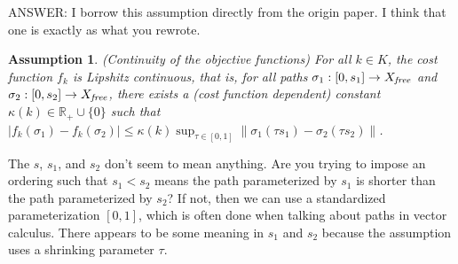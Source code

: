 \documentclass{article}
\newtheorem{asmp}{Assumption}
\begin{document}


{\sc ANSWER: I borrow this assumption directly from the origin paper. I think that one is exactly as what you rewrote.}

\begin{asmp}{(Continuity of the objective functions)}
\label{asmp:continuity}
For all $k\in K$, the cost function $f_k$ is Lipshitz continuous, that is, for all paths $\sigma_1 : [0, s_{1}] \rightarrow X_{\it free}$ and $ \sigma_2 : [0, s_{2}] \rightarrow X_{\it free}$, there exists a (cost function dependent) constant $\kappa(k)\in \mathbb{R}_{+}\cup \{0 \}$ such that $ | f_{k} ( \sigma_{1} ) - f_{k} ( \sigma_{2} ) | \leq \kappa(k) \sup_{\tau \in [0, 1]} \lVert \sigma_{1} (\tau s_{1}) - \sigma_{2} (\tau s_{2}) \rVert $.
\end{asmp}

{\sc The $s$, $s_1$, and $s_2$ don't seem to mean anything.  Are you trying to impose an ordering such that $s_1<s_2$ means the path parameterized by $s_1$ is shorter than the path parameterized by $s_2$?  If not, then we can use a standardized parameterization $[0,1]$, which is often done when talking about paths in vector calculus.  There appears to be some meaning in $s_1$ and $s_2$ because the assumption uses a shrinking parameter $\tau$.}

\end{document}

